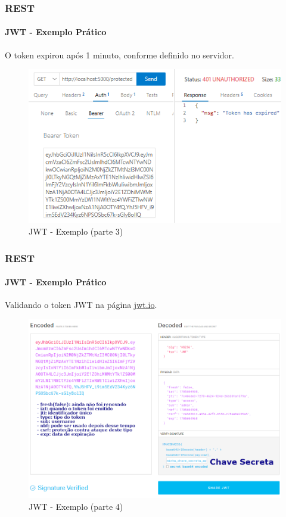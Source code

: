 \documentclass[
	9pt, %
	t, %
]{beamer}
\begin{document}
\begin{frame}
	\frametitle{REST}
	\framesubtitle{JWT - Exemplo Prático}

	\centering
	O token expirou após 1 minuto, conforme definido no servidor.
	
	\begin{figure}
		\includegraphics[width=0.9\linewidth]{jwt-3.png}
		\caption{JWT - Exemplo (parte 3)}
		\label{fig:jwt_example3}
	\end{figure}

\end{frame}

\begin{frame}
	\frametitle{REST}
	\framesubtitle{JWT - Exemplo Prático}

	\centering
	Validando o token JWT na página \href{https://jwt.io/}{jwt.io}.

	\begin{figure}
		\includegraphics[width=0.75\linewidth]{jwt-4.png}
		\caption{JWT - Exemplo (parte 4)}
		\label{fig:jwt_example4}
	\end{figure}

\end{frame}
\end{document}
